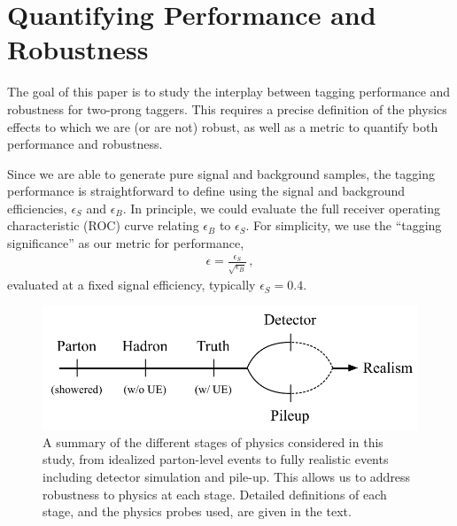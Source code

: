 \documentclass[11pt,letterpaper]{article}
\begin{document}
\section{Quantifying Performance and Robustness}\label{jetsub_2prong_sec:pres}


The goal of this paper is to study the interplay between tagging performance and robustness for two-prong taggers.
%
This requires a precise definition of the physics effects to which we are (or are not) robust, as well as a metric to quantify both performance and robustness.


Since we are able to generate pure signal and background samples, the tagging performance is straightforward to define using the signal and background efficiencies, $\epsilon_S$ and $\epsilon_B$.
%
In principle, we could evaluate the full receiver operating characteristic (ROC) curve relating $\epsilon_B$ to $\epsilon_S$.
%
For simplicity, we use the ``tagging significance'' as our metric for performance,
\begin{align}
\epsilon=\frac{\epsilon_S}{\sqrt{\epsilon_B}}\,,
\end{align}
evaluated at a fixed signal efficiency, typically $\epsilon_S = 0.4$.

\begin{figure}[t]
\begin{center}
\includegraphics[width=0.75\columnwidth]{jetsub_2prong_realism_levels}
\end{center}
\caption{A summary of the different stages of physics considered in
  this study, from idealized parton-level events to fully realistic
  events including detector simulation and pile-up.
  This allows us to
  address robustness to physics at each stage.
  Detailed definitions of
  each stage, and the physics probes used, are given in the text.
   }
\label{jetsub_2prong_fig:realism}
\end{figure}
\end{document}
